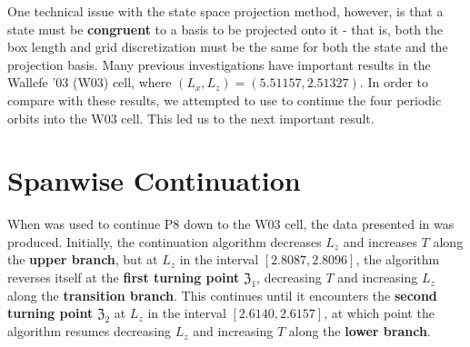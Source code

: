 One technical  issue with the state space projection method, however, is that a state must be {\bf congruent} to a basis to be projected onto it - that is, both the box length and grid discretization must be the same for both the state and the projection basis. Many previous investigations have important results in the Wallefe '03 (W03) cell, where $(L_x,L_z) = (5.51157,2.51327)$. In order to compare with these results, we attempted to use  to continue the four periodic orbits into the W03 cell. This led us to the next important result.

\section{Spanwise Continuation}

When  was used to continue P8 down to the W03 cell, the data presented in  was produced.  Initially, the continuation algorithm decreases $L_z$ and increases $T$ along the {\bf upper branch}, but at $L_z$ in the interval $[2.8087, 2.8096]$, the algorithm reverses itself at the {\bf first turning point} $\mathfrak{Z}_1$, decreasing $T$ and increasing $L_z$ along the {\bf transition branch}. This continues until it encounters the {\bf second turning point} $\mathfrak{Z}_2$ at  $L_z$ in the interval $[2.6140,2.6157]$, at which point the algorithm resumes decreasing $L_z$ and increasing $T$ along the {\bf lower branch}.\\

